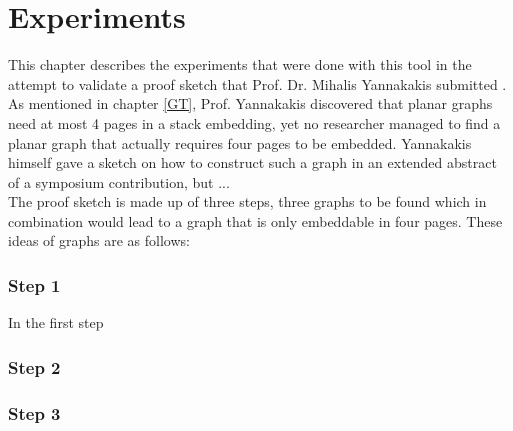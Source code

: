 
\chapter{Experiments}
  \label{Exp}
  
This chapter describes the experiments that were done with this tool in the attempt to validate a proof sketch that Prof. Dr. Mihalis Yannakakis submitted \cite{yannakakis1986four}.\\
As mentioned in chapter \autoref{GT}, Prof. Yannakakis discovered that planar graphs need at most 4 pages in a stack embedding, yet no researcher managed to find a planar graph that actually requires four pages to be embedded. Yannakakis himself gave a sketch \cite{yannakakis1986four} on how to construct such a graph in an extended abstract of a symposium contribution, but ...\\
The proof sketch is made up of three steps, three graphs to be found which in combination would lead to a graph that is only embeddable in four pages. These ideas of graphs are as follows:\\
\subsection*{Step 1}
In the first step 
\subsection*{Step 2}
\subsection*{Step 3}


